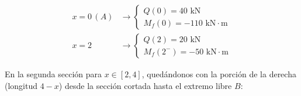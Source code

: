 \begin{center}
\begin{minipage}{0.48\textwidth}
\begin{equation*}
            \begin{aligned}

                x = 0\,(A) & \to \begin{cases} Q(0) = 40\text{ kN} \\ M_f(0) = -110\text{ kN}\cdot\text{m} \end{cases}  \\[4pt]

                x = 2      & \to \begin{cases} Q(2) = 20\text{ kN} \\ M_f(2^-) = -50\text{ kN}\cdot\text{m} \end{cases}

            \end{aligned}

        \end{equation*}

    \end{minipage}

\end{center}



\vspace{1em}




En la segunda sección para $x \in [2, 4]$, quedándonos con la porción de la derecha (longitud $4-x$) desde la sección cortada hasta el extremo libre $B$:



